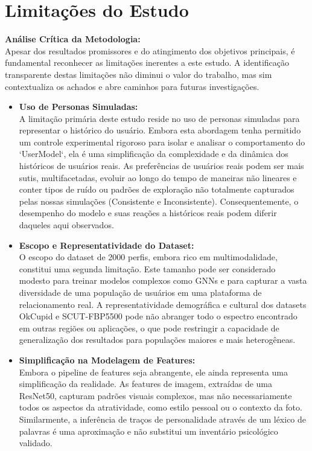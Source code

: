 \section{Limitações do Estudo}
\label{sec:discussao_limitacoes}

\textbf{Análise Crítica da Metodologia:} \\
Apesar dos resultados promissores e do atingimento dos objetivos principais, é fundamental reconhecer as limitações inerentes a este estudo. A identificação transparente destas limitações não diminui o valor do trabalho, mas sim contextualiza os achados e abre caminhos para futuras investigações.

\begin{itemize}
    \item \textbf{Uso de Personas Simuladas:}
    \\ A limitação primária deste estudo reside no uso de personas simuladas para representar o histórico do usuário. Embora esta abordagem tenha permitido um controle experimental rigoroso para isolar e analisar o comportamento do `UserModel`, ela é uma simplificação da complexidade e da dinâmica dos históricos de usuários reais. As preferências de usuários reais podem ser mais sutis, multifacetadas, evoluir ao longo do tempo de maneiras não lineares e conter tipos de ruído ou padrões de exploração não totalmente capturados pelas nossas simulações (Consistente e Inconsistente). Consequentemente, o desempenho do modelo e suas reações a históricos reais podem diferir daqueles aqui observados.

    \item \textbf{Escopo e Representatividade do Dataset:}
    \\ O escopo do dataset de 2000 perfis, embora rico em multimodalidade, constitui uma segunda limitação. Este tamanho pode ser considerado modesto para treinar modelos complexos como GNNs e para capturar a vasta diversidade de uma população de usuários em uma plataforma de relacionamento real. A representatividade demográfica e cultural dos datasets OkCupid e SCUT-FBP5500 pode não abranger todo o espectro encontrado em outras regiões ou aplicações, o que pode restringir a capacidade de generalização dos resultados para populações maiores e mais heterogêneas.

    \item \textbf{Simplificação na Modelagem de Features:}
    \\ Embora o pipeline de features seja abrangente, ele ainda representa uma simplificação da realidade. As features de imagem, extraídas de uma ResNet50, capturam padrões visuais complexos, mas não necessariamente todos os aspectos da atratividade, como estilo pessoal ou o contexto da foto. Similarmente, a inferência de traços de personalidade através de um léxico de palavras é uma aproximação e não substitui um inventário psicológico validado.


\end{itemize}
